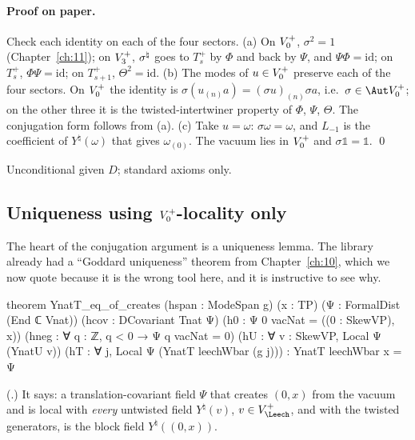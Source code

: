 \paragraph{Proof on paper.}  Check each identity on each of the four sectors.  (a) On $V_0^{+}$,
$\sigma^2=1$ (Chapter~\ref{ch:11}); on $V_3^{+}$, $\sigma^{\natural}$ goes to $T_s^+$ by $\Phi$ and back by $\Psi$,
and $\Psi\Phi=\mathrm{id}$; on $T_s^+$, $\Phi\Psi=\mathrm{id}$; on $T_{s+1}^+$, $\Theta^2=\mathrm{id}$.
(b) The modes of $u\in V_0^{+}$ preserve each of the four sectors.  On $V_0^{+}$ the identity is
$\sigma(u_{(n)}a)=(\sigma u)_{(n)}\sigma a$, i.e.\ $\sigma\in\Aut\chXIVA$; on the other three it is the
twisted-intertwiner property of $\Phi$, $\Psi$, $\Theta$.  The conjugation form follows from (a).
(c) Take $u=\omega$: $\sigma\omega=\omega$, and $L_{-1}$ is the coefficient of $Y^\natural(\omega)$ that
gives $\omega_{(0)}$.  The vacuum lies in $V_0^{+}$ and $\sigma\mathbb 1=\mathbb 1$. \qed

\begin{status}Unconditional given $D$; standard axioms only.\end{status}

\subsection{\texorpdfstring{Uniqueness using $V_0^{+}$-locality only}{Uniqueness using V0+-locality only}}

The heart of the conjugation argument is a uniqueness lemma.  The library already had a
``Goddard uniqueness'' theorem from Chapter~\ref{ch:10}, which we now quote because it is the wrong
tool here, and it is instructive to see why.

\begin{leancode}
theorem YnatT_eq_of_creates (hspan : ModeSpan g) (x : TP) (Ψ : FormalDist (End ℂ Vnat))
    (hcov : DCovariant Tnat Ψ) (h0 : Ψ 0 vacNat = ((0 : SkewVP), x))
    (hneg : ∀ q : ℤ, q < 0 → Ψ q vacNat = 0) (hU : ∀ v : SkewVP, Local Ψ (YnatU v))
    (hT : ∀ j, Local Ψ (YnatT leechWbar (g j))) : YnatT leechWbar x = Ψ
\end{leancode}
(.)  It says: a translation-covariant field $\Psi$ that creates
$(0,x)$ from the vacuum and is local with \emph{every} untwisted field $Y^\natural(v)$,
$v\in V_\Leech^+$, and with the twisted generators, is the block field $Y^\natural((0,x))$.

